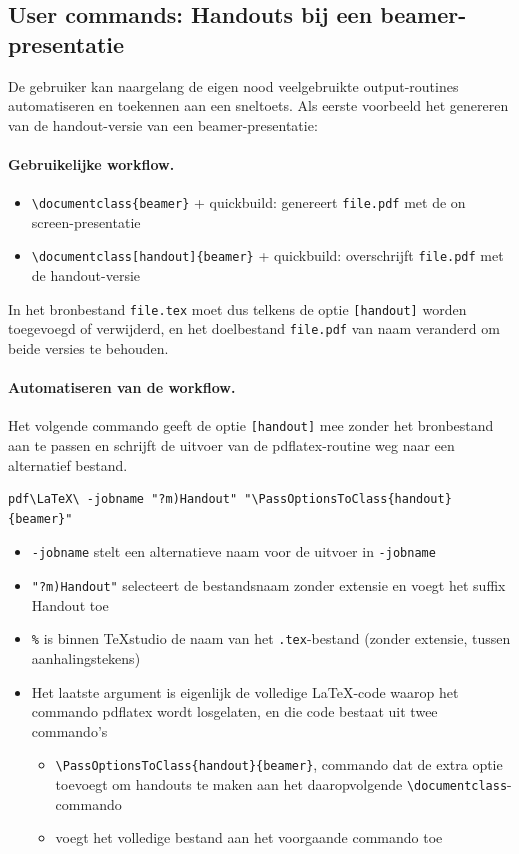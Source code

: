 \documentclass[kulak]{kulakarticle} %
\begin{document}
\subsection{User commands: Handouts bij een beamer-presentatie}
De gebruiker kan naargelang de eigen nood veelgebruikte output-routines automatiseren en toekennen aan een sneltoets. Als eerste voorbeeld het genereren van de handout-versie van een beamer-presentatie:
\paragraph{Gebruikelijke workflow.}
\begin{itemize}
	\item \verb+\documentclass{beamer}+ + quickbuild: genereert \texttt{file.pdf} met de on screen-presentatie
	\item \verb+\documentclass[handout]{beamer}+ + quickbuild: overschrijft \texttt{file.pdf} met de handout-versie
\end{itemize}
In het bronbestand \texttt{file.tex} moet dus telkens de optie \texttt{[handout]} worden toegevoegd of verwijderd, en het doelbestand \texttt{file.pdf} van naam veranderd om beide versies te behouden.
\paragraph{Automatiseren van de workflow.}

Het volgende commando geeft de optie \texttt{[handout]} mee zonder het bronbestand aan te passen en schrijft de uitvoer van de pdflatex-routine weg naar een alternatief bestand.
\begin{verbatim}
pdf\LaTeX\ -jobname "?m)Handout" "\PassOptionsToClass{handout}{beamer}"
\end{verbatim}

\begin{itemize}
	\item \verb+-jobname+ stelt een alternatieve naam voor de uitvoer in
	      \texttt{-jobname}
	\item \verb+"?m)Handout"+ selecteert de bestandsnaam zonder extensie en voegt het suffix Handout toe
	\item \verb+%+ is binnen TeXstudio de naam van het \texttt{.tex}-bestand (zonder extensie, tussen aanhalingstekens)
	\item Het laatste argument is eigenlijk de volledige \LaTeX-code waarop het commando pdflatex wordt losgelaten, en die code bestaat uit twee commando's
	      \begin{itemize}
		      \item \verb+\PassOptionsToClass{handout}{beamer}+, commando dat de extra optie toevoegt om handouts te maken aan het daaropvolgende \verb+\documentclass+-commando
		      \item \verb++ voegt het volledige bestand aan het voorgaande commando toe
	      \end{itemize}
\end{itemize}
\end{document}
